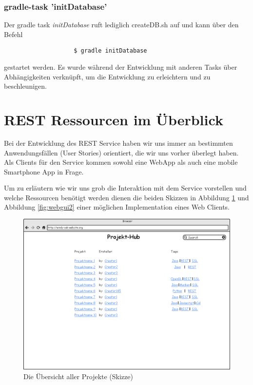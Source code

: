 \documentclass[12pt]{scrartcl}
\begin{document}
			\subsubsection{gradle-task 'initDatabase'}
				Der gradle task \emph{initDatabase} ruft lediglich createDB.sh auf und kann über den Befehl
				\begin{verbatim}
					$ gradle initDatabase
				\end{verbatim}
				gestartet werden. Es wurde während der Entwicklung mit anderen Tasks über Abhängigkeiten verknüpft, um die Entwicklung zu erleichtern und zu beschleunigen.
			
	\section{REST Ressourcen im Überblick}
		
		Bei der Entwicklung des REST Service haben wir uns immer an bestimmten Anwendungsfällen (User Stories) orientiert, die wir uns vorher überlegt haben. Als Clients für den Service kommen sowohl eine WebApp als auch eine mobile Smartphone App in Frage.
		
		Um zu erläutern wie wir uns grob die Interaktion mit dem Service vorstellen und welche Ressourcen benötigt werden dienen die beiden Skizzen in Abbildung \ref{fig:webgui1} und Abbildung \ref{fig:webgui2} einer möglichen Implementation eines Web Clients.
		
		\begin{figure}[h]
			\centering
			\includegraphics[width=0.8\linewidth]{Bilder/Hauptseite.png}
			\caption[Hauptseite]{Die Übersicht aller Projekte (Skizze)}
			\label{fig:webgui1}
		\end{figure}
		
\end{document}
